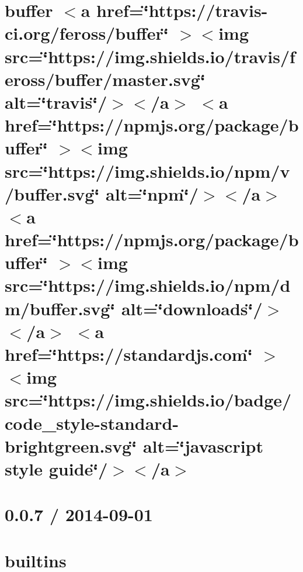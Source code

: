 \documentclass[twoside]{book}
\newcommand{\+}{\discretionary{\mbox{\scriptsize$\hookleftarrow$}}{}{}}
\begin{document}
\chapter{buffer \texorpdfstring{$<$}{<}a href=\char`\"{}https\+://travis-\/ci.\+org/feross/buffer\char`\"{} \texorpdfstring{$>$}{>}\texorpdfstring{$<$}{<}img src=\char`\"{}https\+://img.\+shields.\+io/travis/feross/buffer/master.\+svg\char`\"{} alt=\char`\"{}travis\char`\"{}/\texorpdfstring{$>$}{>}\texorpdfstring{$<$}{<}/a\texorpdfstring{$>$}{>} \texorpdfstring{$<$}{<}a href=\char`\"{}https\+://npmjs.\+org/package/buffer\char`\"{} \texorpdfstring{$>$}{>}\texorpdfstring{$<$}{<}img src=\char`\"{}https\+://img.\+shields.\+io/npm/v/buffer.\+svg\char`\"{} alt=\char`\"{}npm\char`\"{}/\texorpdfstring{$>$}{>}\texorpdfstring{$<$}{<}/a\texorpdfstring{$>$}{>} \texorpdfstring{$<$}{<}a href=\char`\"{}https\+://npmjs.\+org/package/buffer\char`\"{} \texorpdfstring{$>$}{>}\texorpdfstring{$<$}{<}img src=\char`\"{}https\+://img.\+shields.\+io/npm/dm/buffer.\+svg\char`\"{} alt=\char`\"{}downloads\char`\"{}/\texorpdfstring{$>$}{>}\texorpdfstring{$<$}{<}/a\texorpdfstring{$>$}{>} \texorpdfstring{$<$}{<}a href=\char`\"{}https\+://standardjs.\+com\char`\"{} \texorpdfstring{$>$}{>}\texorpdfstring{$<$}{<}img src=\char`\"{}https\+://img.\+shields.\+io/badge/code\+\_\+style-\/standard-\/brightgreen.\+svg\char`\"{} alt=\char`\"{}javascript style guide\char`\"{}/\texorpdfstring{$>$}{>}\texorpdfstring{$<$}{<}/a\texorpdfstring{$>$}{>}}
\label{md__c___users_vaishnavi_jadhav__desktop__developer_code_mean_stack_example_client_node_modules_buffer__r_e_a_d_m_e}

\chapter{0.0.7 / 2014-\/09-\/01}
\label{md__c___users_vaishnavi_jadhav__desktop__developer_code_mean_stack_example_client_node_modules_builtins__history}

\chapter{builtins}
\label{md__c___users_vaishnavi_jadhav__desktop__developer_code_mean_stack_example_client_node_modules_builtins__readme}

\end{document}
